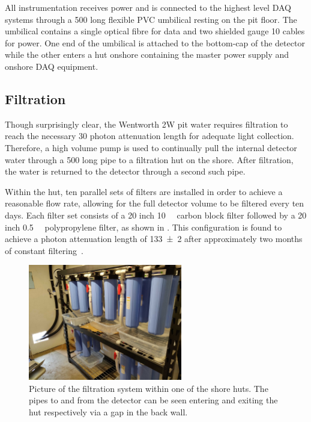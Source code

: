 All \chipsfive instrumentation receives power and is connected to the highest level DAQ systems
through a \SI{500}{} long flexible PVC umbilical resting on the pit floor. The umbilical
contains a single optical fibre for data and two shielded gauge 10 cables for power. One end of
the umbilical is attached to the bottom-cap of the detector while the other enters a hut onshore
containing the master power supply and onshore DAQ equipment.

\subsection{Filtration} %
\label{sec:chips_detector_water} %

Though surprisingly clear, the Wentworth 2W pit water requires filtration to reach the necessary
\SI{30}{} photon attenuation length for adequate light collection. Therefore, a high
volume pump is used to continually pull the internal detector water through a \SI{500}{}
long pipe to a filtration hut on the shore. After filtration, the water is returned to the
detector through a second such pipe.

Within the hut, ten parallel sets of filters are installed in order to achieve a reasonable flow
rate, allowing for the full detector volume to be filtered every ten days. Each filter set
consists of a 20 inch \SI{10}{\micro{}} carbon block filter followed by a 20 inch
\SI{0.5}{\micro{}} polypropylene filter, as shown in . This
configuration is found to achieve a photon attenuation length of \SI{133\pm2}{} after
approximately two months of constant filtering~\cite{campbell2020}.

\begin{figure} %
    \includegraphics[width=0.6\textwidth]{diagrams/4-chips/filtration.pdf}
    \caption[Picture of the \chipsfive filtration system]
    {Picture of the \chipsfive filtration system within one of the shore huts. The pipes to and
        from the detector can be seen entering and exiting the hut respectively via a gap in the
        back wall.}
    \label{fig:filtration}
\end{figure}

